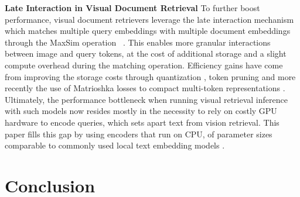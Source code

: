 \noindent\textbf{Late Interaction in Visual Document Retrieval}  To further boost performance, visual document retrievers leverage the late interaction mechanism~ which matches multiple query embeddings with multiple document embeddings through the MaxSim operation ~. This enables more granular interactions between image and query tokens, at the cost of additional storage and a slight compute overhead during the matching operation. Efficiency gains have come from improving the storage costs through quantization , token pruning  and more recently the use of Matrioshka losses to compact multi-token representations . Ultimately, the performance bottleneck when running visual retrieval inference with such models now resides mostly in the necessity to rely on costly GPU hardware to encode queries, which sets apart text from vision retrieval. This paper fills this gap by using encoders that run on CPU, of parameter sizes comparable to commonly used local text embedding models .






\section{Conclusion}

